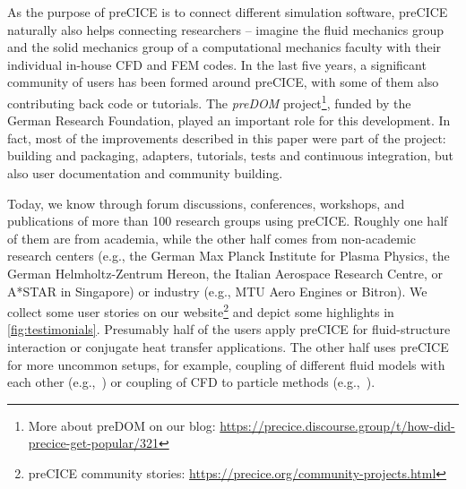 As the purpose of preCICE is to connect different simulation software, preCICE naturally also helps connecting researchers -- imagine the fluid mechanics group and the solid mechanics group of a computational mechanics faculty with their individual in-house CFD and FEM codes.
In the last five years, a significant community of users has been formed around preCICE, with some of them also contributing back code or tutorials. The \textit{preDOM} project\footnote{More about preDOM on our blog: \url{https://precice.discourse.group/t/how-did-precice-get-popular/321}}, funded by the German Research Foundation, played an important role for this development. In fact, most of the improvements described in this paper were part of the project: building and packaging, adapters, tutorials, tests and continuous integration, but also user documentation and community building.   

Today, we know through forum discussions, conferences, workshops, and publications of more than 100 research groups using preCICE. Roughly one half of them are from academia, while the other half comes from non-academic research centers (e.g., the German Max Planck Institute for Plasma Physics, the German Helmholtz-Zentrum Hereon, the Italian Aerospace Research Centre, or A*STAR in Singapore) or industry (e.g., MTU Aero Engines or Bitron).   
We collect some user stories on our website\footnote{preCICE community stories: \url{https://precice.org/community-projects.html}}
and depict some highlights in \autoref{fig:testimonials}.
Presumably half of the users apply preCICE for fluid-structure interaction or conjugate heat transfer applications. The other half uses preCICE for more uncommon setups, for example, coupling of different fluid models with each other (e.g.,~\cite{revell2020coupled}) or coupling of CFD to particle methods (e.g.,~\cite{besseron2021eulerian}). 

